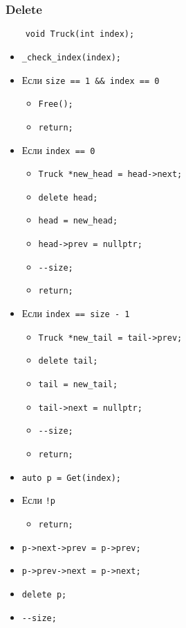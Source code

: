 \subsubsection{Delete}

\begin{lstlisting}
    void Truck(int index);
\end{lstlisting}

\begin{itemize}
    \item \verb|_check_index(index);|
    \item Если \verb|size == 1 && index == 0|
        \begin{itemize}
            \item \verb|Free();|
            \item \verb|return;|
        \end{itemize}
    \item Если \verb|index == 0|
        \begin{itemize}
            \item \verb|Truck *new_head = head->next;|
            \item \verb|delete head;|
            \item \verb|head = new_head;|
            \item \verb|head->prev = nullptr;|
            \item \verb|--size;|
            \item \verb|return;|
        \end{itemize}
    \item Если \verb|index == size - 1|
        \begin{itemize}
            \item \verb|Truck *new_tail = tail->prev;|
            \item \verb|delete tail;|
            \item \verb|tail = new_tail;|
            \item \verb|tail->next = nullptr;|
            \item \verb|--size;|
            \item \verb|return;|
        \end{itemize}
    \item \verb|auto p = Get(index);|
    \item Если \verb|!p|
        \begin{itemize}
            \item \verb|return;|
        \end{itemize}
    \item \verb|p->next->prev = p->prev;|
    \item \verb|p->prev->next = p->next;|
    \item \verb|delete p;|
    \item \verb|--size;|
\end{itemize}


